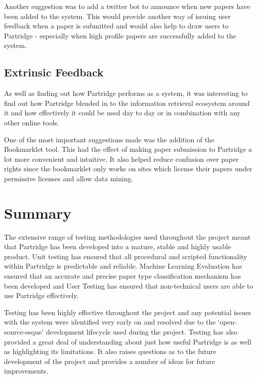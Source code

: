 Another suggestion was to add a twitter bot to announce when new papers have
been added to the system. This would provide another way of issuing user
feedback when a paper is submitted and would also help to draw users to
Partridge - especially when high profile papers are successfully added to the
system.

\subsection{Extrinsic Feedback}

As well as finding out how Partridge performs as a system, it was interesting
to find out how Partridge blended in to the information retrieval ecosystem around
it and how effectively it could be used day to day or in combination with any other
online tools.

One of the most important suggestions made was the addition of the Bookmarklet
tool. This had the effect of making paper submission to Partridge a lot more
convenient and intuitive. It also helped reduce confusion over paper
rights since the bookmarklet only works on sites which license
their papers under permissive licenses and allow data mining. 

\section{Summary}

The extensive range of testing methodologies used throughout the project meant
that Partridge has been developed into a mature, stable and highly usable
product. Unit testing has ensured that all procedural and scripted
functionality within Partridge is predictable and reliable. Machine Learning
Evaluation has ensured that an accurate and precise paper type classification
mechanism has been developed and User Testing has ensured that non-technical
users are able to use Partridge effectively.

Testing has been highly effective throughout the project and any potential
issues with the system were identified very early on and resolved due to the
`open-source-esque' development lifecycle used during the project.  Testing has
also provided a great deal of understanding about just how useful Partridge is
as well as highlighting its limitations. It also raises questions as to the
future development of the project and provides a number of ideas for future
improvements.
